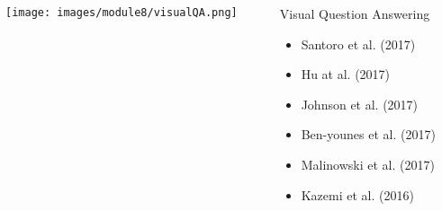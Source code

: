 \begin{frame}
	\begin{columns}
		\begin{column}{0.6\textwidth}
			\vspace{0.2in}
			\begin{overlayarea}{\textwidth}{\textheight}
				\texttt{[image: images/module8/visualQA.png]}
			\end{overlayarea}
		\end{column}

		\begin{column}{0.4\textwidth}
			\begin{overlayarea}{\textwidth}{\textheight}

				\begin{block}{Visual Question Answering
					}
					\begin{itemize}
						\item Santoro et al. (2017) \cite{DBLP:conf/nips/SantoroRBMPBL17}
						\item Hu at al. (2017) \cite{DBLP:conf/iccv/HuARDS17}
						\item Johnson et al. (2017) \cite{DBLP:conf/cvpr/JohnsonHMFZG17}
						\item Ben-younes et al. (2017) \cite{DBLP:conf/iccv/Ben-younesCCT17}
						\item Malinowski et al. (2017) \cite{DBLP:conf/iccv/MalinowskiRF15}
						\item Kazemi et al. (2016) \cite{DBLP:journals/corr/KazemiE17}
					\end{itemize}
				\end{block}
			\end{overlayarea}
		\end{column}

	\end{columns}
\end{frame}


